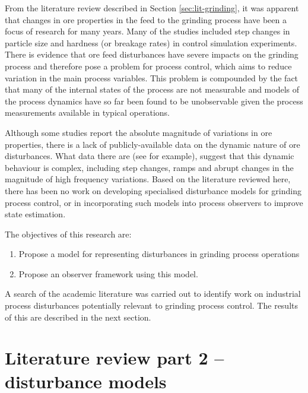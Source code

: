 From the literature review described in Section \ref{sec:lit-grinding}, it was apparent that changes in ore properties in the feed to the grinding process have been a focus of research for many years. Many of the studies included step changes in particle size and hardness (or breakage rates) in control simulation experiments. There is evidence that ore feed disturbances have severe impacts on the grinding process and therefore pose a problem for process control, which aims to reduce variation in the main process variables. This problem is compounded by the fact that many of the internal states of the process are not measurable and models of the process dynamics have so far been found to be unobservable given the process measurements available in typical operations. 

Although some studies report the absolute magnitude of variations in ore properties, there is a lack of publicly-available data on the dynamic nature of ore disturbances. What data there are (see \cite{steyn_investigating_2018} for example), suggest that this dynamic behaviour is complex, including step changes, ramps and abrupt changes in the magnitude of high frequency variations. Based on the literature reviewed here, there has been no work on developing specialised disturbance models for grinding process control, or in incorporating such models into process observers to improve state estimation.

The objectives of this research are:
\begin{enumerate}
	\item Propose a model for representing disturbances in grinding process operations
	\item Propose an observer framework using this model.
\end{enumerate}
A search of the academic literature was carried out to identify work on industrial process disturbances potentially relevant to grinding process control. The results of this are described in the next section.


\section{Literature review part 2 – disturbance models} \label{sec:lit-disturb-models}

